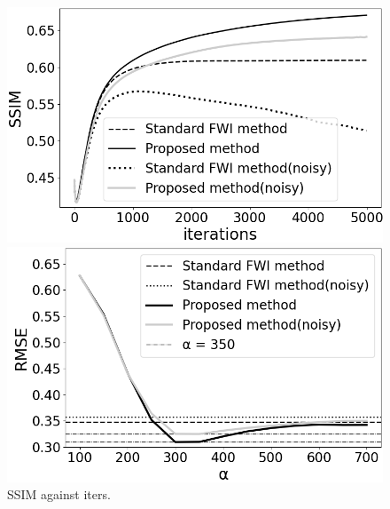 \begin{figure}[htbp]
    \centering
    \hspace{-3mm}
    \begin{minipage}{58mm}
        \centering
        \includegraphics[width=\linewidth]{public/iters-ssim-all}
        \caption{SSIM against iters.}
        \label{fig:iters-ssim-noisy}
        \vspace{-5mm}
    \end{minipage}
    \hspace{-1mm}
    \begin{minipage}{58mm}
        \centering
        \includegraphics[width=\linewidth]{public/alpha-rmse-edited}

\end{minipage}
\end{figure}
